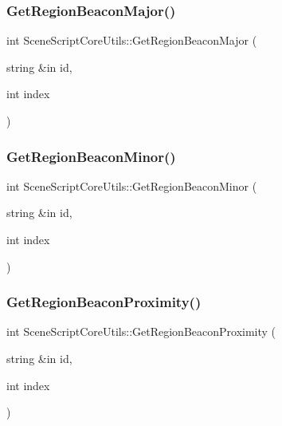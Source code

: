 \hypertarget{class_scene_script_core_utils_ab14a3ede103acb243489482f41f5fca0}{}\label{class_scene_script_core_utils_ab14a3ede103acb243489482f41f5fca0} 
\subsubsection{\texorpdfstring{Get\+Region\+Beacon\+Major()}{GetRegionBeaconMajor()}}
{\footnotesize\ttfamily int Scene\+Script\+Core\+Utils\+::\+Get\+Region\+Beacon\+Major (\begin{DoxyParamCaption}\item[{string \&in}]{id,  }\item[{int}]{index }\end{DoxyParamCaption})}

\hypertarget{class_scene_script_core_utils_a19636799c31d3276957ccfc9e97dc648}{}\label{class_scene_script_core_utils_a19636799c31d3276957ccfc9e97dc648} 
\subsubsection{\texorpdfstring{Get\+Region\+Beacon\+Minor()}{GetRegionBeaconMinor()}}
{\footnotesize\ttfamily int Scene\+Script\+Core\+Utils\+::\+Get\+Region\+Beacon\+Minor (\begin{DoxyParamCaption}\item[{string \&in}]{id,  }\item[{int}]{index }\end{DoxyParamCaption})}

\hypertarget{class_scene_script_core_utils_a0ddeb1ee4d6d9dd34cca8ec28bd80e03}{}\label{class_scene_script_core_utils_a0ddeb1ee4d6d9dd34cca8ec28bd80e03} 
\subsubsection{\texorpdfstring{Get\+Region\+Beacon\+Proximity()}{GetRegionBeaconProximity()}}
{\footnotesize\ttfamily int Scene\+Script\+Core\+Utils\+::\+Get\+Region\+Beacon\+Proximity (\begin{DoxyParamCaption}\item[{string \&in}]{id,  }\item[{int}]{index }\end{DoxyParamCaption})}

